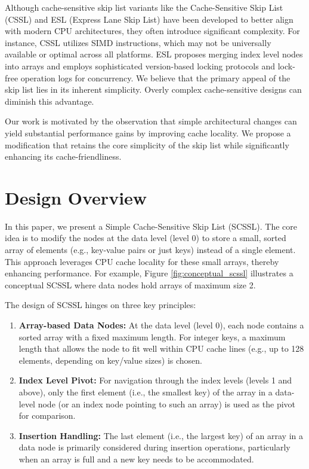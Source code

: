 \documentclass[sigconf]{acmart}
\begin{document}
Although cache-sensitive skip list variants like the Cache-Sensitive Skip List (CSSL) \cite{CSSL20XX} and ESL (Express Lane Skip List) \cite{ESL20XX} have been developed to better align with modern CPU architectures, they often introduce significant complexity. For instance, CSSL utilizes SIMD instructions, which may not be universally available or optimal across all platforms. ESL proposes merging index level nodes into arrays and employs sophisticated version-based locking protocols and lock-free operation logs for concurrency. We believe that the primary appeal of the skip list lies in its inherent simplicity. Overly complex cache-sensitive designs can diminish this advantage.

Our work is motivated by the observation that simple architectural changes can yield substantial performance gains by improving cache locality. We propose a modification that retains the core simplicity of the skip list while significantly enhancing its cache-friendliness.

\section{Design Overview}
\label{sec:design_overview}

In this paper, we present a Simple Cache-Sensitive Skip List (SCSSL). The core idea is to modify the nodes at the data level (level 0) to store a small, sorted array of elements (e.g., key-value pairs or just keys) instead of a single element. This approach leverages CPU cache locality for these small arrays, thereby enhancing performance. For example, Figure \ref{fig:conceptual_scssl} illustrates a conceptual SCSSL where data nodes hold arrays of maximum size 2.

The design of SCSSL hinges on three key principles:
\begin{enumerate}
    \item \textbf{Array-based Data Nodes:} At the data level (level 0), each node contains a sorted array with a fixed maximum length. For integer keys, a maximum length that allows the node to fit well within CPU cache lines (e.g., up to 128 elements, depending on key/value sizes) is chosen.
    \item \textbf{Index Level Pivot:} For navigation through the index levels (levels 1 and above), only the first element (i.e., the smallest key) of the array in a data-level node (or an index node pointing to such an array) is used as the pivot for comparison.
    \item \textbf{Insertion Handling:} The last element (i.e., the largest key) of an array in a data node is primarily considered during insertion operations, particularly when an array is full and a new key needs to be accommodated.
\end{enumerate}
\end{document}

